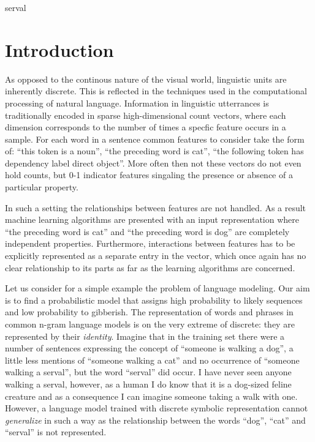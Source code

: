 
serval
\chapter{Introduction}
\label{introduction}
As opposed to the continous nature of the visual world, linguistic units
are inherently discrete. This is reflected in the techniques used in the
computational processing of natural language.
Information in linguistic utterrances is traditionally encoded
in sparse high-dimensional count vectors, where each
dimension corresponds to the number of times a specfic feature occurs in a
sample. For each word in a sentence common features to consider take the form of:
``this token is a noun'', ``the preceding word is cat'',
``the following token has dependency label direct object''.
More often then not these vectors do not even hold counts, but 0-1
indicator features singaling the presence or absence of a particular property.

In such a setting the relationships between features are not handled.
As a result machine learning algorithms are presented with an input representation where
``the preceding word is cat'' and ``the preceding word is dog''
are completely independent properties.
Furthermore, interactions between features has to be
explicitly represented as a separate entry in the vector, which once again has
no clear relationship to its parts as far as the learning algorithms are concerned.

Let us consider for a simple example the problem of language modeling.
Our  aim is to find a probabilistic model
that assigns high probability to likely sequences and low probability to gibberish.
The representation of words and phrases in common n-gram language models is on the
very extreme of discrete: they are represented by their \emph{identity}.
Imagine that in the training set there were a number of sentences expressing the concept
of ``someone is walking a dog'', a little less mentions of ``someone walking a cat''
and no occurrence of ``someone walking a serval'', but the word ``serval'' did occur.
I have never seen anyone walking a serval, however, as a human I do know that it is a dog-sized
feline creature and as a consequence I can imagine someone taking a walk with one.
However, a language model trained with discrete symbolic representation cannot
\emph{generalize} in such a way as the
relationship between the words ``dog'', ``cat'' and ``serval'' is not represented.

